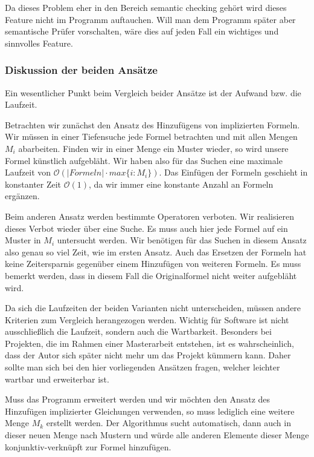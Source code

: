 Da dieses Problem eher in den Bereich semantic checking gehört wird dieses Feature nicht im Programm auftauchen. Will man dem Programm später aber semantische Prüfer vorschalten, wäre dies auf jeden Fall ein wichtiges und sinnvolles Feature.

\subsubsection{Diskussion der beiden Ansätze}

Ein wesentlicher Punkt beim Vergleich beider Ansätze ist der Aufwand bzw. die Laufzeit. 

Betrachten wir zunächst den Ansatz des Hinzufügens von implizierten Formeln. Wir müssen in einer Tiefensuche jede Formel betrachten und mit allen Mengen $M_i$ abarbeiten. Finden wir in einer Menge ein Muster wieder, so wird unsere Formel künstlich aufgebläht. Wir haben also für das Suchen eine maximale Laufzeit von $\mathcal{O}(\mathit{\vert Formeln\vert \cdot max\{i : M_i\}})$. Das Einfügen der Formeln geschieht in konstanter Zeit $\mathcal{O}(1)$, da wir immer eine konstante Anzahl an Formeln ergänzen.

Beim anderen Ansatz werden bestimmte Operatoren verboten. Wir realisieren dieses Verbot wieder über eine Suche. Es muss auch hier jede Formel auf ein Muster in $M_i$ untersucht werden. Wir benötigen für das Suchen in diesem Ansatz also genau so viel Zeit, wie im ersten Ansatz. Auch das Ersetzen der Formeln hat keine Zeitersparnis gegenüber einem Hinzufügen von weiteren Formeln. Es muss bemerkt werden, dass in diesem Fall die Originalformel nicht weiter aufgebläht wird.

Da sich die Laufzeiten der beiden Varianten nicht unterscheiden, müssen andere Kriterien zum Vergleich herangezogen werden. Wichtig für Software ist nicht ausschließlich die Laufzeit, sondern auch die Wartbarkeit. Besonders bei Projekten, die im Rahmen einer Masterarbeit entstehen, ist es wahrscheinlich, dass der Autor sich später nicht mehr um das Projekt kümmern kann. Daher sollte man sich bei den hier vorliegenden Ansätzen fragen, welcher leichter wartbar und erweiterbar ist.

Muss das Programm erweitert werden und wir möchten den Ansatz des Hinzufügen implizierter Gleichungen verwenden, so muss lediglich eine weitere Menge $M_k$ erstellt werden. Der Algorithmus sucht automatisch, dann auch in dieser neuen Menge nach Mustern und würde alle anderen Elemente dieser Menge konjunktiv-verknüpft zur Formel hinzufügen. 

